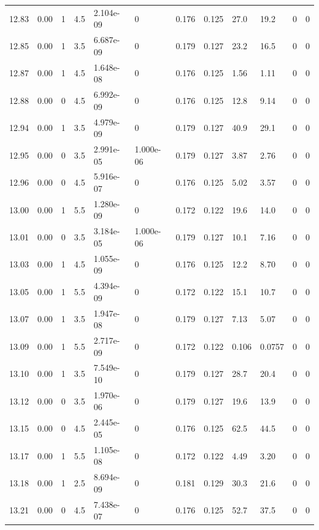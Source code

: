 \documentclass[preview]{standalone}
\begin{document}
{{{{{{{{{{{{\begin{tabular}{L{1.2cm}C{1.2cm} C{0.3cm}C{0.5cm} C{1.4cm}C{1.4cm} C{1.4cm}C{1.4cm} C{1.6cm}C{1.6cm} C{1.6cm}C{1.6cm}}
  12.83  &  0.00  & 1     & 4.5 &  2.104e-09  & 0  &  0.176&   0.125& 27.0 & 19.2   &  0 & 0  \\ 
  12.85  &  0.00  & 1     & 3.5 &  6.687e-09  & 0  &  0.179&   0.127& 23.2 & 16.5   &  0 & 0  \\ 
  12.87  &  0.00  & 1     & 4.5 &  1.648e-08  & 0  &  0.176&   0.125& 1.56 & 1.11   &  0 & 0  \\ 
  12.88  &  0.00  & 0     & 4.5 &  6.992e-09  & 0  &  0.176&   0.125& 12.8 & 9.14   &  0 & 0  \\ 
  12.94  &  0.00  & 1     & 3.5 &  4.979e-09  & 0  &  0.179&   0.127& 40.9 & 29.1   &  0 & 0  \\ 
  12.95  &  0.00  & 0     & 3.5 &  2.991e-05  & 1.000e-06  &  0.179&   0.127& 3.87 & 2.76   &  0 & 0  \\ 
  12.96  &  0.00  & 0     & 4.5 &  5.916e-07  & 0  &  0.176&   0.125& 5.02 & 3.57   &  0 & 0  \\ 
  13.00  &  0.00  & 1     & 5.5 &  1.280e-09  & 0  &  0.172&   0.122& 19.6 & 14.0   &  0 & 0  \\ 
  13.01  &  0.00  & 0     & 3.5 &  3.184e-05  & 1.000e-06  &  0.179&   0.127& 10.1 & 7.16   &  0 & 0  \\ 
  13.03  &  0.00  & 1     & 4.5 &  1.055e-09  & 0  &  0.176&   0.125& 12.2 & 8.70   &  0 & 0  \\ 
  13.05  &  0.00  & 1     & 5.5 &  4.394e-09  & 0  &  0.172&   0.122& 15.1 & 10.7   &  0 & 0  \\ 
  13.07  &  0.00  & 1     & 3.5 &  1.947e-08  & 0  &  0.179&   0.127& 7.13 & 5.07   &  0 & 0  \\ 
  13.09  &  0.00  & 1     & 5.5 &  2.717e-09  & 0  &  0.172&   0.122& 0.106 & 0.0757   &  0 & 0  \\ 
  13.10  &  0.00  & 1     & 3.5 &  7.549e-10  & 0  &  0.179&   0.127& 28.7 & 20.4   &  0 & 0  \\ 
  13.12  &  0.00  & 0     & 3.5 &  1.970e-06  & 0  &  0.179&   0.127& 19.6 & 13.9   &  0 & 0  \\ 
  13.15  &  0.00  & 0     & 4.5 &  2.445e-05  & 0  &  0.176&   0.125& 62.5 & 44.5   &  0 & 0  \\ 
  13.17  &  0.00  & 1     & 5.5 &  1.105e-08  & 0  &  0.172&   0.122& 4.49 & 3.20   &  0 & 0  \\ 
  13.18  &  0.00  & 1     & 2.5 &  8.694e-09  & 0  &  0.181&   0.129& 30.3 & 21.6   &  0 & 0  \\ 
  13.21  &  0.00  & 0     & 4.5 &  7.438e-07  & 0  &  0.176&   0.125& 52.7 & 37.5   &  0 & 0  \\ 

\end{tabular}}}}}}}}}}}}}
\end{document}
